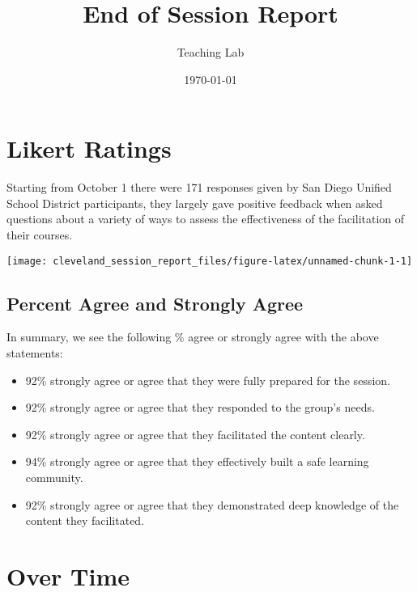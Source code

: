 \documentclass[10,a4paperpaper,]{article}
\title{End of Session Report}
\author{Teaching Lab}
\date{\today}
\begin{document}
\renewcommand{\contentsname}{Table of Contents}

\renewcommand{\pagename}{Page}


\maketitle
\tableofcontents
{}
\clearpage

\section{Likert Ratings}

Starting from October 1 there were 171 responses given by San Diego
Unified School District participants, they largely gave positive
feedback when asked questions about a variety of ways to assess the
effectiveness of the facilitation of their courses.

\begin{center}\texttt{[image: cleveland\_session\_report\_files/figure-latex/unnamed-chunk-1-1]} \end{center}

\subsection{Percent Agree and Strongly Agree}

In summary, we see the following \% agree or strongly agree with the
above statements:

\begin{itemize}
\tightlist
\item
  92\% strongly agree or agree that they were fully prepared for the
  session.
\item
  92\% strongly agree or agree that they responded to the group's needs.
\item
  92\% strongly agree or agree that they facilitated the content
  clearly.
\item
  94\% strongly agree or agree that they effectively built a safe
  learning community.
\item
  92\% strongly agree or agree that they demonstrated deep knowledge of
  the content they facilitated.
\end{itemize}

\section{Over Time}
\end{document}
